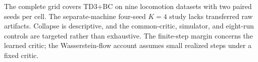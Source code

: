 The complete grid covers TD3+BC on nine locomotion datasets with two paired seeds per cell. The separate-machine four-seed $K=4$ study lacks transferred raw artifacts. Collapse is descriptive, and the common-critic, simulator, and eight-run controls are targeted rather than exhaustive. The finite-step margin concerns the learned critic; the Wasserstein-flow account assumes small realized steps under a fixed critic.
